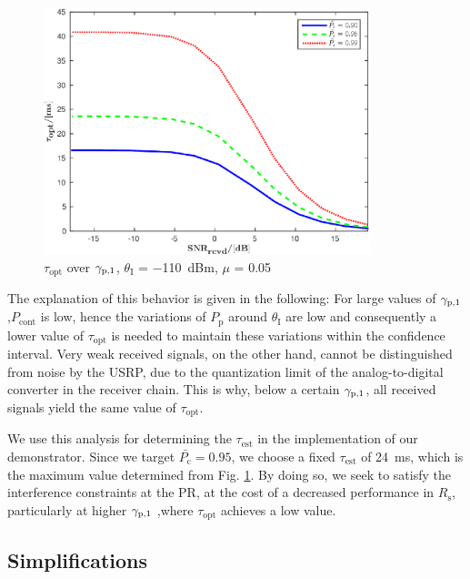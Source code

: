 \begin{figure}
	\centering
	\includegraphics[width=0.85\textwidth]{figures/tau_snr}
	\caption{$\tau_\textrm{opt}$ over ${\gamma}_{\text{p,1}}$, $\theta_\textrm{I}$ = \SI{-110}{dBm}, $\mu$ = 0.05}
	\label{Tausnr}
\end{figure}

The explanation of this behavior is given in the following: For large values of ${\gamma}_{\text{p,1}}$,$P_\textrm{cont}$ is low, hence the variations of $P_\textrm{p}$ around $\theta_\textrm{I}$ are low and consequently a lower value of $\tau_\textrm{opt}$ is needed to maintain these variations within the confidence interval. Very weak received signals, on the other hand, cannot be distinguished from noise by the USRP, due to the quantization limit of the analog-to-digital converter in the receiver chain. This is why, below a certain ${\gamma}_{\text{p,1}}$, all received signals yield the same value of $\tau_\textrm{opt}$.

We use this analysis for determining the $\tau_\textrm{est}$ in the implementation of our demonstrator. Since we target $\bar{P_\textrm{c}} = 0.95$, we choose a fixed $\tau_\textrm{est}$ of \SI{24}{ms}, which is the maximum value determined from Fig. \ref{Tausnr}. By doing so, we seek to satisfy the interference constraints at the PR, at the cost of a decreased performance in $R_\textrm{s}$, particularly at higher ${\gamma}_{\text{p,1}}$ ,where $\tau_\textrm{opt}$ achieves a low value.


\subsection{Simplifications}

